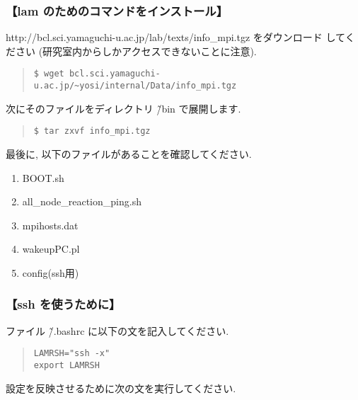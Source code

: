 \documentclass[a4paper,titlepage]{jreport}
\begin{document}
\subsubsection{【lam のためのコマンドをインストール】}
http://bcl.sci.yamaguchi-u.ac.jp/lab/texts/info\_mpi.tgz をダウンロード
してください (研究室内からしかアクセスできないことに注意).

\begin{quote}
\begin{screen}
\begin{verbatim}
$ wget bcl.sci.yamaguchi-u.ac.jp/~yosi/internal/Data/info_mpi.tgz
\end{verbatim}
\end{screen}
\end{quote}


次にそのファイルをディレクトリ \~/bin で展開します.

\begin{quote}
\begin{screen}
\begin{verbatim}
$ tar zxvf info_mpi.tgz
\end{verbatim}
\end{screen}
\end{quote}

最後に, 以下のファイルがあることを確認してください.

\begin{enumerate}
\item BOOT.sh
\item all\_node\_reaction\_ping.sh
\item mpihosts.dat
\item wakeupPC.pl
\item config(ssh用)
\end{enumerate}

\subsubsection{【ssh を使うために】}

ファイル \~/.bashrc に以下の文を記入してください.

\begin{quote}
\begin{screen}
\begin{verbatim}
LAMRSH="ssh -x"
export LAMRSH
\end{verbatim}
\end{screen}
\end{quote}

設定を反映させるために次の文を実行してください.
\end{document}

